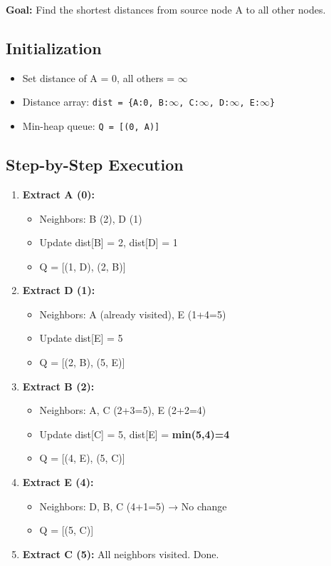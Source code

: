 \documentclass[a4paper,14pt]{extarticle}
\begin{document}
\textbf{Goal:} Find the shortest distances from source node A to all other nodes.

\subsection*{Initialization}
\begin{itemize}
    \item Set distance of A = 0, all others = $\infty$
    \item Distance array: \texttt{dist = \{A:0, B:$\infty$, C:$\infty$, D:$\infty$, E:$\infty$\}}
    \item Min-heap queue: \texttt{Q = [(0, A)]}
\end{itemize}

\subsection*{Step-by-Step Execution}

\begin{enumerate}
    \item \textbf{Extract A (0):}
    \begin{itemize}
        \item Neighbors: B (2), D (1)
        \item Update dist[B] = 2, dist[D] = 1
        \item Q = [(1, D), (2, B)]
    \end{itemize}

    \item \textbf{Extract D (1):}
    \begin{itemize}
        \item Neighbors: A (already visited), E (1+4=5)
        \item Update dist[E] = 5
        \item Q = [(2, B), (5, E)]
    \end{itemize}

    \item \textbf{Extract B (2):}
    \begin{itemize}
        \item Neighbors: A, C (2+3=5), E (2+2=4)
        \item Update dist[C] = 5, dist[E] = \textbf{min(5,4)=4}
        \item Q = [(4, E), (5, C)]
    \end{itemize}

    \item \textbf{Extract E (4):}
    \begin{itemize}
        \item Neighbors: D, B, C (4+1=5) → No change
        \item Q = [(5, C)]
    \end{itemize}

    \item \textbf{Extract C (5):} All neighbors visited. Done.
\end{enumerate}
\end{document}

